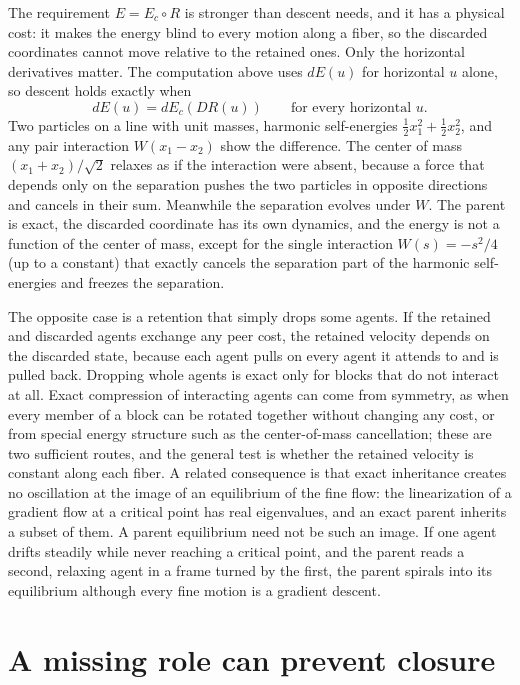 The requirement $E=E_c\circ R$ is stronger than descent needs, and it has a physical cost: it makes the energy blind to every motion along a fiber, so the discarded coordinates cannot move relative to the retained ones. Only the horizontal derivatives matter. The computation above uses $dE(u)$ for horizontal $u$ alone, so descent holds exactly when
\begin{equation}
dE(u)=dE_c(DR(u))\qquad\text{for every horizontal }u.
\end{equation}
Two particles on a line with unit masses, harmonic self-energies $\tfrac12x_1^2+\tfrac12x_2^2$, and any pair interaction $W(x_1-x_2)$ show the difference. The center of mass $(x_1+x_2)/\sqrt2$ relaxes as if the interaction were absent, because a force that depends only on the separation pushes the two particles in opposite directions and cancels in their sum. Meanwhile the separation evolves under $W$. The parent is exact, the discarded coordinate has its own dynamics, and the energy is not a function of the center of mass, except for the single interaction $W(s)=-s^2/4$ (up to a constant) that exactly cancels the separation part of the harmonic self-energies and freezes the separation.

The opposite case is a retention that simply drops some agents. If the retained and discarded agents exchange any peer cost, the retained velocity depends on the discarded state, because each agent pulls on every agent it attends to and is pulled back. Dropping whole agents is exact only for blocks that do not interact at all. Exact compression of interacting agents can come from symmetry, as when every member of a block can be rotated together without changing any cost, or from special energy structure such as the center-of-mass cancellation; these are two sufficient routes, and the general test is whether the retained velocity is constant along each fiber. A related consequence is that exact inheritance creates no oscillation at the image of an equilibrium of the fine flow: the linearization of a gradient flow at a critical point has real eigenvalues, and an exact parent inherits a subset of them. A parent equilibrium need not be such an image. If one agent drifts steadily while never reaching a critical point, and the parent reads a second, relaxing agent in a frame turned by the first, the parent spirals into its equilibrium although every fine motion is a gradient descent.

\section{A missing role can prevent closure}


